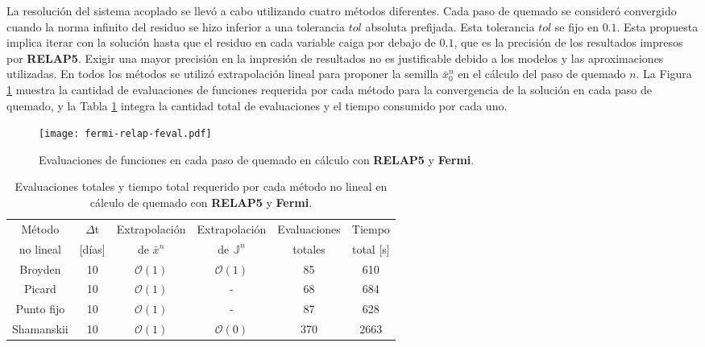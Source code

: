 La resolución del sistema acoplado se llevó a cabo utilizando cuatro métodos diferentes.
Cada paso de quemado se consideró convergido cuando la norma infinito del residuo se hizo inferior a una tolerancia $tol$ absoluta prefijada.
Esta tolerancia $tol$ se fijo en $0.1$.
Esta propuesta implica iterar con la solución hasta que el residuo en cada variable caiga por debajo de $0.1$, que es la precisión de los resultados impresos por \textbf{RELAP5}.
Exigir una mayor precisión en la impresión de resultados no es justificable debido a los modelos y las aproximaciones utilizadas.
En todos los métodos se utilizó extrapolación lineal para proponer la semilla $\bar{x}_0^n$ en el cálculo del paso de quemado $n$.
La Figura \ref{figura-relap-fermi} muestra la cantidad de evaluaciones de funciones requerida por cada método para la convergencia de la solución en cada paso de quemado,
y la Tabla \ref{tabla-relap-fermi} integra la cantidad total de evaluaciones y el tiempo consumido por cada uno.

\begin{figure}[h]
  \centering
  \texttt{[image: fermi-relap-feval.pdf]}  
  \caption[Evaluaciones de funciones en cada paso de quemado en cálculo con \textbf{RELAP5} y \textbf{Fermi}]
  {Evaluaciones de funciones en cada paso de quemado en cálculo con \textbf{RELAP5} y \textbf{Fermi}.}
  \label{figura-relap-fermi}
\end{figure}

\begin{table}[h]
  \centering
  \begin{tabular}{c c c c cc } \hline
      \multicolumn{1}{c}{Método} & \multirow{1}{*}{$\Delta$t} & \multicolumn{1}{c}{Extrapolación} & \multicolumn{1}{c}{Extrapolación}  & \multicolumn{1}{c}{Evaluaciones} & \multicolumn{1}{c}{Tiempo} \\ %
      \multicolumn{1}{c}{no lineal} & [días] & \multicolumn{1}{c}{de $\bar{x}^n$} & \multicolumn{1}{c}{de $\mathbb{J}^n$} & \multicolumn{1}{c}{totales} & \multicolumn{1}{c}{total [s]}\\ \hline %
      Broyden & 10 & $\mathscr{O}(1)$ & $\mathscr{O}(1)$ & 85 & 610 \\ %
      Picard & 10 & $\mathscr{O}(1)$ & - & 68 & 684 \\ %
      Punto fijo & 10 & $\mathscr{O}(1)$ & - & 87 & 628  \\ %
      Shamanskii & 10 & $\mathscr{O}(1)$ & $\mathscr{O}(0)$& 370 & 2663  \\ \hline
   \end{tabular}   
   \caption[Evaluaciones totales y tiempo total requerido por cada método no lineal en cálculo de quemado con \textbf{RELAP5} y \textbf{Fermi}]
   {Evaluaciones totales y tiempo total requerido por cada método no lineal en cálculo de quemado con \textbf{RELAP5} y \textbf{Fermi}.}
   \label{tabla-relap-fermi}
\end{table}

